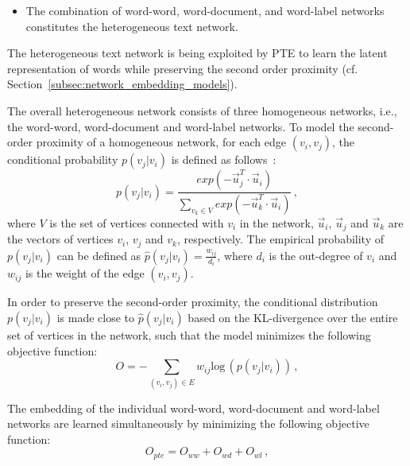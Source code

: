 \begin{itemize}
\begin{itemize}
  \item The combination of word-word, word-document, and word-label networks constitutes the heterogeneous text network.  \\
  
\end{itemize}

The heterogeneous text network is being exploited by PTE to learn the latent representation of words while preserving the second order proximity (cf. Section~\ref{subsec:network_embedding_models}).

The overall heterogeneous network consists of three homogeneous networks, i.e., the word-word, word-document and word-label networks. %
To model the second-order proximity of a homogeneous network, for each edge $(v_i,v_j)$, the conditional probability $p(v_{j}|v_{i})$ is defined as follows~\cite{LINE}: 
\begin{equation}
p(v_{j}|v_{i})=\frac{exp(-\vec{u}_{j}^{T}\cdot\vec{u}_{i})}{\sum\limits_{v_k\in V} exp(-\vec{u}_{k}^{T}\cdot\vec{u}_{i})}\,,
\end{equation}
where $V$ is the set of vertices connected with $v_i$ in the network, $\vec{u}_{i}$, $\vec{u}_{j}$ and $\vec{u}_{k}$ are the vectors of vertices $v_i$, $v_j$ and $v_k$, respectively. The empirical probability of $p(v_{j}|v_{i})$ can be defined as $\hat{p}(v_j|v_i)=\frac{w_{ij}}{d_i}$, where $d_i$ is the out-degree of $v_i$ and $w_{ij}$ is the weight of the edge $(v_i,v_j)$.

In order to preserve the second-order proximity, the conditional distribution $p(v_{j}|v_{i})$ is made close to $\hat{p}(v_{j}|v_{i})$ based on the KL-divergence over the entire set of vertices in the network, such that the model minimizes the following objective function:
\begin{equation}\label{optimizationHomo}
O=-\sum_{(v_i,v_j) \in E}w_{ij} \textrm{log} \,(p(v_{j}|v_{i}))\,,
\end{equation}

The embedding of the individual word-word, word-document and word-label networks are learned simultaneously by minimizing the following objective function:
 \begin{equation}\label{optimizationHet}
 O_{pte}={O}_{ww}+{O}_{wd}+{O}_{wl}\,,
 \end{equation}


\end{itemize}
